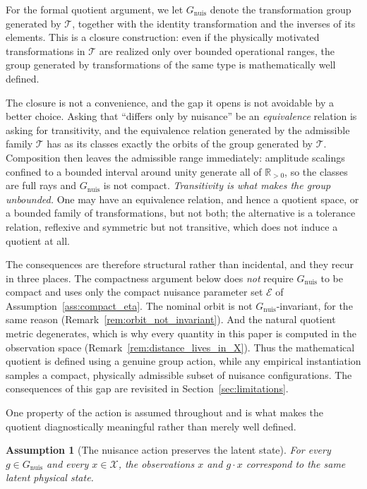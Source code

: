 \documentclass[a4paper]{cas-sc}
\newtheorem{assumption}{Assumption}
\newcommand{\X}{\ensuremath{\mathcal{X}}}
\newcommand{\EtaSpace}{\ensuremath{\mathcal{E}}}
\newcommand{\Gnuis}{\ensuremath{G_{\mathrm{nuis}}}}
\newcommand{\R}{\ensuremath{\mathbb{R}}}
\begin{document}
For the formal quotient argument, we let \(\Gnuis\) denote the
transformation group generated by \(\mathcal{T}\), together with the
identity transformation and the inverses of its elements. This is a closure
construction: even if the physically motivated transformations in
\(\mathcal{T}\) are realized only over bounded operational ranges, the group
generated by transformations of the same type is mathematically well
defined.

The closure is not a convenience, and the gap it opens is not avoidable by a
better choice. Asking that ``differs only by nuisance'' be an
\emph{equivalence} relation is asking for transitivity, and the equivalence
relation generated by the admissible family \(\mathcal{T}\) has as its classes
exactly the orbits of the group generated by \(\mathcal{T}\). Composition then
leaves the admissible range immediately: amplitude scalings confined to a
bounded interval around unity generate all of \(\R_{>0}\), so the classes are
full rays and \(\Gnuis\) is not compact. \emph{Transitivity is what makes the
group unbounded.} One may have an equivalence relation, and hence a quotient
space, or a bounded family of transformations, but not both; the alternative
is a tolerance relation, reflexive and symmetric but not transitive, which
does not induce a quotient at all.

The consequences are therefore structural rather than incidental, and they
recur in three places. The compactness argument below does \emph{not} require
\(\Gnuis\) to be compact and uses only the compact nuisance parameter set
\(\EtaSpace\) of Assumption~\ref{ass:compact_eta}. The nominal orbit is not
\(\Gnuis\)-invariant, for the same reason
(Remark~\ref{rem:orbit_not_invariant}). And the natural quotient metric
degenerates, which is why every quantity in this paper is computed in the
observation space (Remark~\ref{rem:distance_lives_in_X}). Thus the mathematical
quotient is defined using a genuine group action, while any empirical
instantiation samples a compact, physically admissible subset of nuisance
configurations. The consequences of this gap are revisited in
Section~\ref{sec:limitations}.

One property of the action is assumed throughout and is what makes the
quotient diagnostically meaningful rather than merely well defined.

\begin{assumption}[The nuisance action preserves the latent state]
\label{ass:action_preserves_state}
For every \(g\in\Gnuis\) and every \(x\in\X\), the observations \(x\) and
\(g\cdot x\) correspond to the same latent physical state.
\end{assumption}
\end{document}
